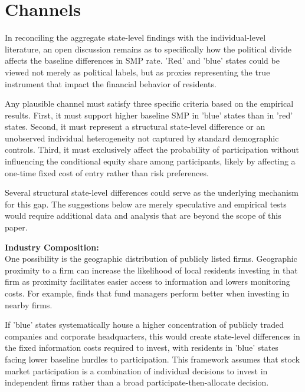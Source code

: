 
\section{Channels}
\label{sec:channels}

In reconciling the aggregate state-level findings with the individual-level literature, an open discussion remains as to specifically how the political divide affects the baseline differences in SMP rate. 'Red' and 'blue' states could be viewed not merely as political labels, but as proxies representing the true instrument that impact the financial behavior of residents.

Any plausible channel must satisfy three specific criteria based on the empirical results. First, it must support higher baseline SMP in 'blue' states than in 'red' states. Second, it must represent a structural state-level difference or an unobserved individual heterogeneity not captured by standard demographic controls. Third, it must exclusively affect the probability of participation without influencing the conditional equity share among participants, likely by affecting a one-time fixed cost of entry rather than risk preferences. 

Several structural state-level differences could serve as the underlying mechanism for this gap. The suggestions below are merely speculative and empirical tests would require additional data and analysis that are beyond the scope of this paper.

\vspace{2em}

\noindent\textbf{Industry Composition:}\\[0.5em]
One possibility is the geographic distribution of publicly listed firms. Geographic proximity to a firm can increase the likelihood of local residents investing in that firm as proximity facilitates easier access to information and lowers monitoring costs. For example, \citet{coval2001} finds that fund managers perform better when investing in nearby firms. 

\noindent If 'blue' states systematically house a higher concentration of publicly traded companies and corporate headquarters, this would create state-level differences in the fixed information costs required to invest, with residents in 'blue' states facing lower baseline hurdles to participation. This framework assumes that stock market participation is a combination of individual decisions to invest in independent firms rather than a broad participate-then-allocate decision.

